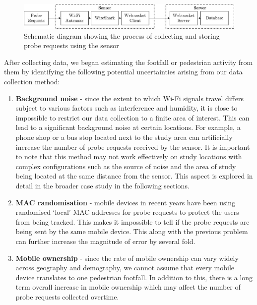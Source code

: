 \begin{figure} 
	\centering \includegraphics[width=\linewidth]
		{images/figure_1.jpeg}
	\caption 
		{Schematic diagram showing the process of collecting and storing probe
		requests using the sensor}
	\label{datacollection_schematic} 
\end{figure}

After collecting data, we began estimating the footfall or pedestrian activity
from them by identifying the following potential uncertainties arising from our
data collection method:

\begin{enumerate} 
\item 
\textbf{Background noise} - since the extent to which Wi-Fi signals travel
        differs subject to various factors such as interference and humidity, it
        is close to impossible to restrict our data collection to a finite area
        of interest. This can lead to a significant background noise at certain
        locations. For example, a phone shop or a bus stop located next to the
        study area can artificially increase the number of probe requests
        received by the sensor.  It is important to note that this method may
        not work effectively on study locations with complex configurations such
        as the source of noise and the area of study being located at the same
        distance from the sensor. This aspect is explored in detail in the
        broader case study in the following sections.
\item 
\textbf{MAC randomisation} - mobile devices in recent years have been using
        randomised `local' MAC addresses for probe requests to protect the users
        from being tracked. This makes it impossible to tell if the probe
        requests are being sent by the same mobile device. This along with the
        previous problem can further increase the magnitude of error by several
        fold.
\item
\textbf{Mobile ownership} - since the rate of mobile ownership can vary widely
		across geography and demography, we cannot assume that every mobile
		device translates to one pedestrian footfall. In addition to this, there
		is a long term overall increase in mobile ownership which may affect 
		the number of probe requests collected overtime.
\end{enumerate}

